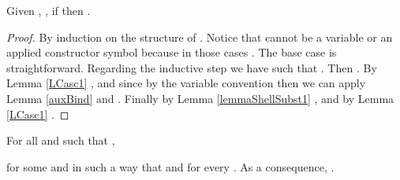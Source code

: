 \begin{lemma}\label{lemmaShellSubst2}
Given , , if  then .
\end{lemma}
\begin{proof}
By induction on the structure of . Notice that  cannot be a variable  or an applied constructor symbol  because in those cases . The base case  is straightforward. Regarding the inductive step we have  such that . Then . By Lemma \ref{LCasc1} , and since  by the variable convention then we can apply Lemma \ref{auxBind} and . Finally by Lemma \ref{lemmaShellSubst1} , and by Lemma \ref{LCasc1} .
\end{proof}



For all  and  such that ,

for some  and   in such a way that  and  for every . As a consequence, .

